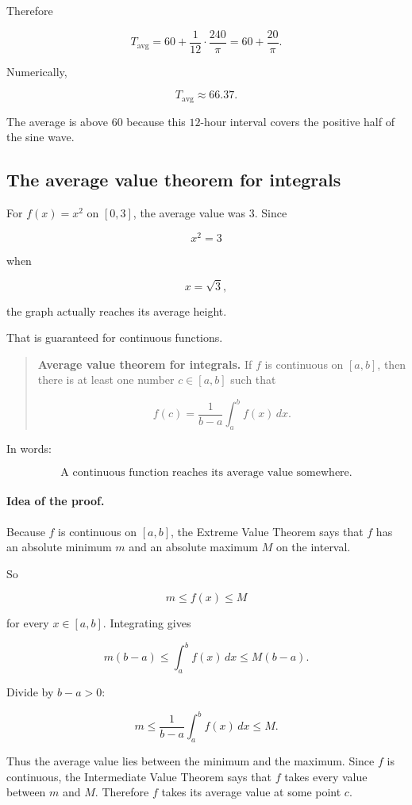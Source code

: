 Therefore

\[
T_{\text{avg}}
=
60+\frac1{12}\cdot\frac{240}{\pi}
=
\boxed{
60+\frac{20}{\pi}
}.
\]

Numerically,

\[
T_{\text{avg}}\approx 66.37.
\]

The average is above \(60\) because this \(12\)-hour interval covers the positive half of
the sine wave.

\subsection{The average value theorem for integrals}
\label{subsec:average-value-theorem-integrals}

For \(f(x)=x^2\) on \([0,3]\), the average value was \(3\).  Since

\[
x^2=3
\]

when

\[
x=\sqrt3,
\]

the graph actually reaches its average height.

That is guaranteed for continuous functions.

\begin{quote}
\textbf{Average value theorem for integrals.}
If \(f\) is continuous on \([a,b]\), then there is at least one number \(c\in[a,b]\) such
that

\[
\boxed{
f(c)=\frac1{b-a}\int_a^b f(x)\,dx.
}
\]
\end{quote}

In words:

\[
\boxed{
\text{A continuous function reaches its average value somewhere.}
}
\]

\paragraph{Idea of the proof.}
Because \(f\) is continuous on \([a,b]\), the Extreme Value Theorem says that \(f\)
has an absolute minimum \(m\) and an absolute maximum \(M\) on the interval.

So

\[
m\le f(x)\le M
\]

for every \(x\in[a,b]\).  Integrating gives

\[
m(b-a)\le \int_a^b f(x)\,dx\le M(b-a).
\]

Divide by \(b-a>0\):

\[
m\le
\frac1{b-a}\int_a^b f(x)\,dx
\le M.
\]

Thus the average value lies between the minimum and the maximum.  Since \(f\) is
continuous, the Intermediate Value Theorem says that \(f\) takes every value between
\(m\) and \(M\).  Therefore \(f\) takes its average value at some point \(c\).

